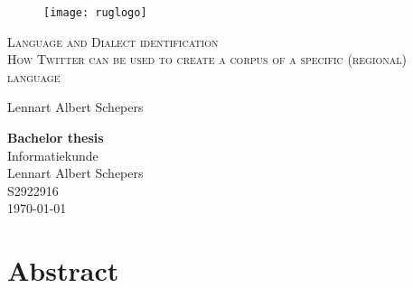 \documentclass[
10pt, %
a4paper, %
oneside, %
headinclude,footinclude, %
] {book}%
\title{\normalfont\spacedallcaps{title}} %
\author{\spacedlowsmallcaps{author}} %
\date{} %
\begin{document}

\pagestyle{scrheadings} %



\hypersetup{pageanchor=false}
\begin{titlepage}
\thispagestyle{empty}
\begin{figure}[h!] %
\texttt{[image: ruglogo]} 
\end{figure}

\begin{center}
\vspace{30 mm}
\begingroup \linespread{1,75} \selectfont 
\textsc{\LARGE Language and Dialect identification}\\
	\textsc{\Large How Twitter can be used to create a corpus of a specific (regional) language}\\[1,5cm]
\endgroup

Lennart Albert Schepers\\[2,5cm]

\end{center}
\vfill
\textbf{Bachelor thesis}\\  %
Informatiekunde\\  %
Lennart Albert Schepers\\
S2922916\\
\today
\end{titlepage}
\hypersetup{pageanchor=true}



\chapter*{Abstract}
\end{document}
